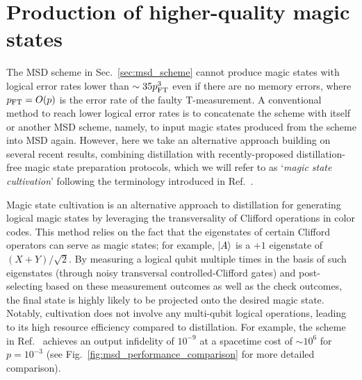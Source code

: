 \documentclass[
 prx,
 reprint,
 superscriptaddress,
 longbibliography,
 dvipsnames
]{revtex4-2}
\begin{document}
\section{Production of higher-quality magic states \label{sec:higher_quality_magic_states}}

The MSD scheme in Sec.~\ref{sec:msd_scheme} cannot produce magic states with logical error rates lower than $\sim 35p_{\mathrm{FT}}^3$ even if there are no memory errors, where $p_{\mathrm{FT}} = O(p)$ is the error rate of the faulty T-measurement.
A conventional method to reach lower logical error rates is to concatenate the scheme with itself or another MSD scheme, namely, to input magic states produced from the scheme into MSD again.
However, here we take an alternative approach building on several recent results, combining distillation with recently-proposed distillation-free magic state preparation protocols, which we will refer to as `\textit{magic state cultivation}' following the terminology introduced in Ref.~\cite{gidney2024magic}.

Magic state cultivation is an alternative approach to distillation for generating logical magic states by leveraging the transversality of Clifford operations in color codes.
This method relies on the fact that the eigenstates of certain Clifford operators can serve as magic states; for example, $\ket{A}$ is a $+1$ eigenstate of $(X + Y)/\sqrt{2}$.
By measuring a logical qubit multiple times in the basis of such eigenstates (through noisy transversal controlled-Clifford gates) and post-selecting based on these measurement outcomes as well as the check outcomes, the final state is highly likely to be projected onto the desired magic state.
Notably, cultivation does not involve any multi-qubit logical operations, leading to its high resource efficiency compared to distillation.
For example, the scheme in Ref.~\cite{gidney2024magic} achieves an output infidelity of $10^{-9}$ at a spacetime cost of $\sim 10^6$ for $p=10^{-3}$ (see Fig.~\ref{fig:msd_performance_comparison} for more detailed comparison).
\end{document}
